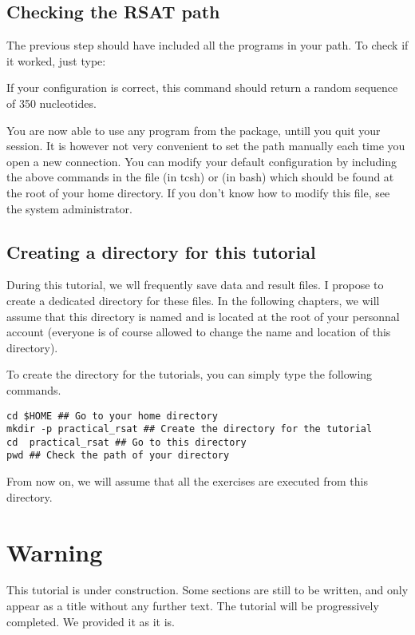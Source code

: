 \subsection{Checking the RSAT path}

 The previous step should have included all the \RSAT programs in
your path.  To check if it worked, just type:


If your configuration is correct, this command should return a random
sequence of 350 nucleotides.

You are now able to use any program from the \RSAT package, untill you
quit your session. It is however not very convenient to set the path
manually each time you open a new connection. You can modify your
default configuration by including the above commands in the file
 (in tcsh) or  (in bash) which should be
found at the root of your home directory. If you don't know how to
modify this file, see the system administrator.

\subsection{Creating a directory for this tutorial}

During this tutorial, we wll frequently save data and result files. I
propose to create a dedicated directory for these files. In the
following chapters, we will assume that this directory is named
 and is located at the root of your personnal
account (everyone is of course allowed to change the name and location
of this directory).

To create the directory for the tutorials, you can simply type the
following commands.

{\color{blue} \begin{footnotesize}
\begin{verbatim}
cd $HOME ## Go to your home directory
mkdir -p practical_rsat ## Create the directory for the tutorial
cd  practical_rsat ## Go to this directory
pwd ## Check the path of your directory
\end{verbatim} \end{footnotesize}
}

From now on, we will assume that all the exercises are executed
from this directory.


\section{Warning}

This tutorial is under construction. Some sections are still to be
written, and only appear as a title without any further text. The
tutorial will be progressively completed. We provided it as it is.
